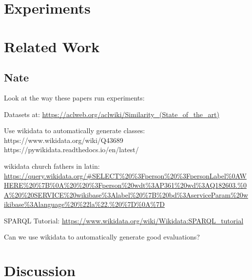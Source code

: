 \documentclass[11pt]{article}
\begin{document}
\section{Experiments}
\label{sec:experiments}

\section{Related Work}
\label{sec:related}

\subsection{Nate}

Look at the way these papers run experiments:

\cite{tifrea2018poincar,meng2019spherical}

Datasets at: \url{https://aclweb.org/aclwiki/Similarity_(State_of_the_art)}

Use wikidata to automatically generate classes: https://www.wikidata.org/wiki/Q43689 
https://pywikidata.readthedocs.io/en/latest/

wikidata church fathers in latin: \url{https://query.wikidata.org/#SELECT%20%3Fperson%20%3FpersonLabel%0AWHERE%20%7B%0A%20%20%3Fperson%20wdt%3AP361%20wd%3AQ182603.%0A%20%20SERVICE%20wikibase%3Alabel%20%7B%20bd%3AserviceParam%20wikibase%3Alanguage%20%22la%22.%20%7D%0A%7D}

SPARQL Tutorial: \url{https://www.wikidata.org/wiki/Wikidata:SPARQL_tutorial}

Can we use wikidata to automatically generate good evaluations?

\section{Discussion}
\label{sec:discussion}




\end{document}
